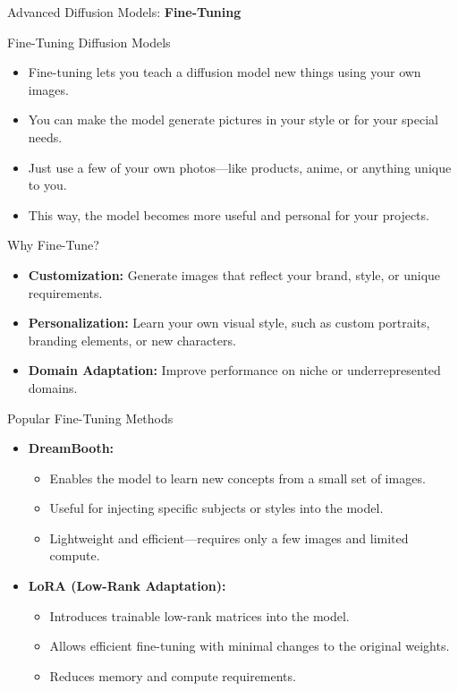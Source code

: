 \begin{frame}{}
    \LARGE Advanced Diffusion Models: \textbf{Fine-Tuning}
\end{frame}

\begin{frame}[allowframebreaks]{Fine-Tuning Diffusion Models}

\vspace{1em}
\begin{itemize}
    \item Fine-tuning lets you teach a diffusion model new things using your own images.
    \item You can make the model generate pictures in your style or for your special needs.
    \item Just use a few of your own photos—like products, anime, or anything unique to you.
    \item This way, the model becomes more useful and personal for your projects.
\end{itemize}

\end{frame}

\begin{frame}[allowframebreaks]{Why Fine-Tune?}
\begin{itemize}
    \item \textbf{Customization:} Generate images that reflect your brand, style, or unique requirements.
    \item \textbf{Personalization:} Learn your own visual style, such as custom portraits, branding elements, or new characters.
    \item \textbf{Domain Adaptation:} Improve performance on niche or underrepresented domains.
\end{itemize}
\end{frame}

\begin{frame}[allowframebreaks]{Popular Fine-Tuning Methods}
\begin{itemize}
    \item \textbf{DreamBooth:}
    \begin{itemize}
        \item Enables the model to learn new concepts from a small set of images.
        \item Useful for injecting specific subjects or styles into the model.
        \item Lightweight and efficient—requires only a few images and limited compute.
    \end{itemize}
    \item \textbf{LoRA (Low-Rank Adaptation):}
    \begin{itemize}
        \item Introduces trainable low-rank matrices into the model.
        \item Allows efficient fine-tuning with minimal changes to the original weights.
        \item Reduces memory and compute requirements.
    \end{itemize}
\end{itemize}
\end{frame}

